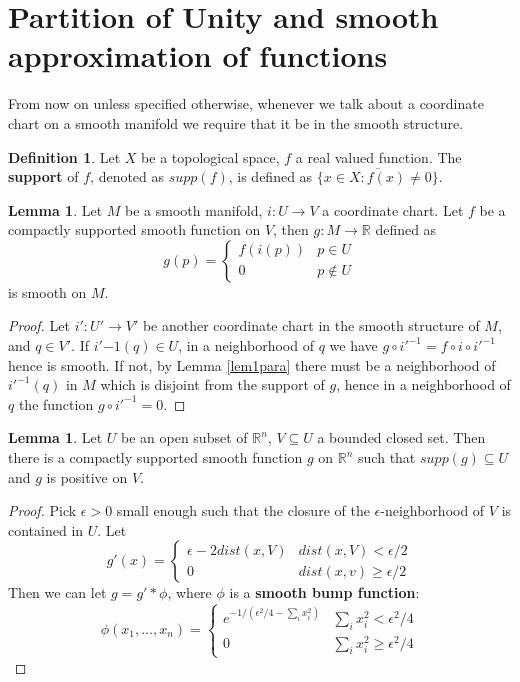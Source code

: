 \documentclass{article}
\theoremstyle{definition}
\newtheorem{lem}[thm]{Lemma}
\newtheorem{dfn}[thm]{Definition}
\begin{document}
\newpage

\section{Partition of Unity and smooth approximation of functions}

From now on unless specified otherwise, whenever we talk about a coordinate chart on a smooth manifold we require that it be in the smooth structure.\\

\begin{dfn}
Let $X$ be a topological space, $f$ a real valued function. The {\bf support} of $f$, denoted as $supp(f)$, is defined as $\overline{\{x\in X: f(x)\not=0\}}$.
\end{dfn}

\begin{lem}\label{lem1pu}
Let $M$ be a smooth manifold, $i: U\rightarrow V$ a coordinate chart. Let $f$ be a compactly supported smooth function on $V$, then $g: M\rightarrow\mathbb{R}$ defined as 
\[g(p)=\begin{cases} f(i(p)) & p\in U\\ 0 & p\not\in U\end{cases}\]
is smooth on $M$.
\end{lem}

\begin{proof}
    Let $i': U'\rightarrow V'$ be another coordinate chart in the smooth structure of $M$, and $q\in V'$. If $i'{-1}(q)\in U$, in a neighborhood of $q$ we have $g\circ i'^{-1}=f\circ i\circ i'^{-1}$ hence is smooth. If not, by Lemma \ref{lem1para} there must be a neighborhood of $i'^{-1}(q)$ in $M$ which is disjoint from the support of $g$, hence in a neighborhood of $q$ the function $g\circ i'^{-1}=0$.
\end{proof}

\begin{lem}\label{lem2pu}
    Let $U$ be an open subset of $\mathbb{R}^n$, $V\subseteq U$ a bounded closed set. Then there is a compactly supported smooth function $g$ on $\mathbb{R}^n$ such that $supp(g)\subseteq U$ and $g$ is positive on $V$. 
\end{lem}

\begin{proof}
    Pick $\epsilon>0$ small enough such that the closure of the $\epsilon$-neighborhood of $V$ is contained in $U$. Let 
    \[g'(x)=\begin{cases}\epsilon-2dist(x, V) & dist(x, V)<\epsilon/2 \\ 0 & dist(x, v) \geq \epsilon/2\end{cases}\]
    Then we can let $g=g'*\phi$, where $\phi$ is a {\bf smooth bump function}:
    \[\phi(x_1, \dots, x_n)=\begin{cases}e^{-1/(\epsilon^2/4-\sum_i x_i^2)} & \sum_i x_i^2<\epsilon^2/4 \\ 0 & \sum_i x_i^2\geq \epsilon^2/4\end{cases}\]
\end{proof}
\end{document}
